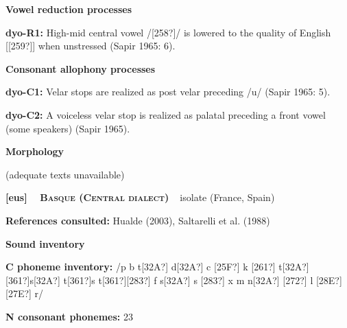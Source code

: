 \begin{styleBody}
\textbf{Vowel reduction processes}
\end{styleBody}

\begin{styleBody}
\textbf{dyo-R1:} High-mid central vowel /[258?]/ is lowered to the quality of English [[259?]] when unstressed (Sapir 1965: 6).
\end{styleBody}

\begin{styleBody}
\textbf{Consonant allophony processes}
\end{styleBody}

\begin{styleBody}
\textbf{dyo-C1: }Velar stops are realized as post velar preceding /u/ (Sapir 1965: 5).
\end{styleBody}

\begin{styleBody}
\textbf{dyo-C2: }A voiceless velar stop is realized as palatal preceding a front vowel (some speakers) (Sapir 1965).
\end{styleBody}

\begin{styleBody}
\textbf{Morphology}
\end{styleBody}

\begin{styleBody}
(adequate texts unavailable)
\end{styleBody}

\clearpage\begin{styleBody}
\textbf{[eus] }\ \ \textbf{\textsc{Basque (Central dialect)}}\textbf{\ \ }isolate (France, Spain)
\end{styleBody}

\begin{styleBody}
\textbf{References consulted: }Hualde (2003), Saltarelli et al. (1988)
\end{styleBody}

\begin{styleBody}
\textbf{Sound inventory}
\end{styleBody}

\begin{styleBody}
\textbf{C phoneme inventory:} /p b t[32A?] d[32A?] c [25F?] k [261?] t[32A?][361?]s[32A?] t[361?]s t[361?][283?] f s[32A?] s [283?] x m n[32A?] [272?] l [28E?] [27E?] r/
\end{styleBody}

\begin{styleBody}
\textbf{N consonant phonemes:} 23
\end{styleBody}

